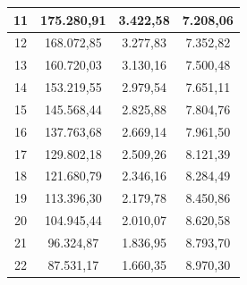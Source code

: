 \documentclass[a4paper,]{article}
\begin{document}
\begin{table}[h!]
\begin{tabular}{|
>{\columncolor[HTML]{EFEFEF}}c |c|c|c|}
11                          & 175.280,91                                          & 3.422,58                                     & 7.208,06                                    \\ \hline
12                          & 168.072,85                                          & 3.277,83                                     & 7.352,82                                    \\ \hline
13                          & 160.720,03                                          & 3.130,16                                     & 7.500,48                                    \\ \hline
14                          & 153.219,55                                          & 2.979,54                                     & 7.651,11                                    \\ \hline
15                          & 145.568,44                                          & 2.825,88                                     & 7.804,76                                    \\ \hline
16                          & 137.763,68                                          & 2.669,14                                     & 7.961,50                                    \\ \hline
17                          & 129.802,18                                          & 2.509,26                                     & 8.121,39                                    \\ \hline
18                          & 121.680,79                                          & 2.346,16                                     & 8.284,49                                    \\ \hline
19                          & 113.396,30                                          & 2.179,78                                     & 8.450,86                                    \\ \hline
20                          & 104.945,44                                          & 2.010,07                                     & 8.620,58                                    \\ \hline
21                          & 96.324,87                                           & 1.836,95                                     & 8.793,70                                    \\ \hline
22                          & 87.531,17                                           & 1.660,35                                     & 8.970,30                                    \\ \hline

\end{tabular}
\end{table}
\end{document}
